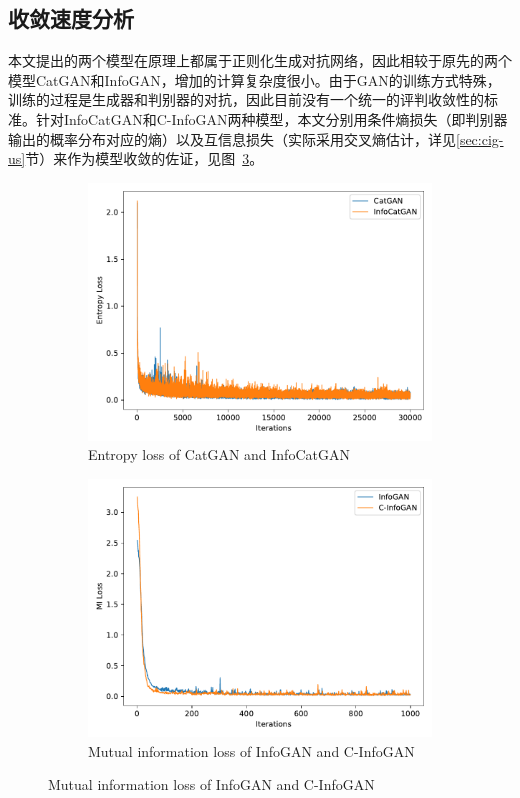 \subsection{收敛速度分析}
本文提出的两个模型在原理上都属于正则化生成对抗网络，因此相较于原先的两个模型CatGAN和InfoGAN，增加的计算复杂度很小。由于GAN的训练方式特殊，训练的过程是生成器和判别器的对抗，因此目前没有一个统一的评判收敛性的标准。针对InfoCatGAN和C-InfoGAN两种模型，本文分别用条件熵损失（即判别器输出的概率分布对应的熵）以及互信息损失（实际采用交叉熵估计，详见\ref{sec:cig-us}节）来作为模型收敛的佐证，见图~\ref{fig:convergence}。
\begin{figure}[htbp]
  \centering
  \begin{subfigure}[b]{\twof\textwidth}
    \includegraphics[width=\textwidth]{Img/icg-convergence.pdf}
    \caption{Entropy loss of CatGAN and InfoCatGAN}
    \label{ffig:icg-convergence}
  \end{subfigure}
  \begin{subfigure}[b]{\twof\textwidth}
    \includegraphics[width=\textwidth]{Img/cig-convergence.pdf}
    \caption{Mutual information loss of InfoGAN and C-InfoGAN}
    \label{ffig:cig-convergence}
  \end{subfigure}
  \label{fig:convergence}
\end{figure}